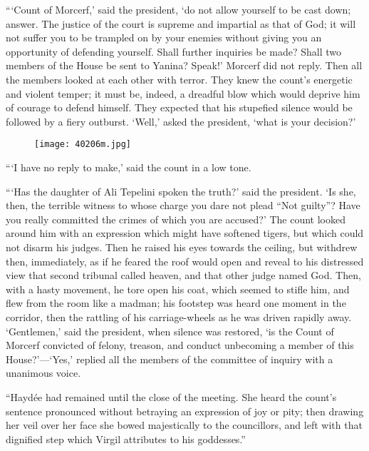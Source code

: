 “‘Count of Morcerf,’ said the president, ‘do not allow yourself to be
cast down; answer. The justice of the court is supreme and impartial as
that of God; it will not suffer you to be trampled on by your enemies
without giving you an opportunity of defending yourself. Shall further
inquiries be made? Shall two members of the House be sent to Yanina?
Speak!’ Morcerf did not reply. Then all the members looked at each
other with terror. They knew the count’s energetic and violent temper;
it must be, indeed, a dreadful blow which would deprive him of courage
to defend himself. They expected that his stupefied silence would be
followed by a fiery outburst. ‘Well,’ asked the president, ‘what is
your decision?’

\begin{figure}[ht]
\texttt{[image: 40206m.jpg]}
\end{figure}

“‘I have no reply to make,’ said the count in a low tone.

“‘Has the daughter of Ali Tepelini spoken the truth?’ said the
president. ‘Is she, then, the terrible witness to whose charge you dare
not plead “Not guilty”? Have you really committed the crimes of which
you are accused?’ The count looked around him with an expression which
might have softened tigers, but which could not disarm his judges. Then
he raised his eyes towards the ceiling, but withdrew then, immediately,
as if he feared the roof would open and reveal to his distressed view
that second tribunal called heaven, and that other judge named God.
Then, with a hasty movement, he tore open his coat, which seemed to
stifle him, and flew from the room like a madman; his footstep was
heard one moment in the corridor, then the rattling of his
carriage-wheels as he was driven rapidly away. ‘Gentlemen,’ said the
president, when silence was restored, ‘is the Count of Morcerf
convicted of felony, treason, and conduct unbecoming a member of this
House?’—‘Yes,’ replied all the members of the committee of inquiry with
a unanimous voice.

“Haydée had remained until the close of the meeting. She heard the
count’s sentence pronounced without betraying an expression of joy or
pity; then drawing her veil over her face she bowed majestically to the
councillors, and left with that dignified step which Virgil attributes
to his goddesses.”
